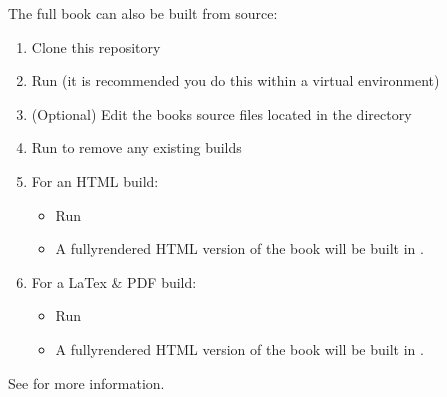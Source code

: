 \documentclass[letterpaper,10pt,english]{jupyterBook}
\begin{document}
\sphinxAtStartPar
The full book can also be built from source:
\begin{enumerate}
%
\item {} 
\sphinxAtStartPar
Clone this repository

\item {} 
\sphinxAtStartPar
Run  (it is recommended you do this within a virtual environment)

\item {} 
\sphinxAtStartPar
(Optional) Edit the books source files located in the  directory

\item {} 
\sphinxAtStartPar
Run  to remove any existing builds

\item {} 
\sphinxAtStartPar
For an HTML build:
\begin{itemize}
\item {} 
\sphinxAtStartPar
Run 

\item {} 
\sphinxAtStartPar
A fully\sphinxhyphen{}rendered HTML version of the book will be built in .

\end{itemize}

\item {} 
\sphinxAtStartPar
For a LaTex \& PDF build:
\begin{itemize}
\item {} 
\sphinxAtStartPar
Run 

\item {} 
\sphinxAtStartPar
A fully\sphinxhyphen{}rendered HTML version of the book will be built in .

\end{itemize}

\end{enumerate}

\sphinxAtStartPar
See  for more information.
\end{document}
